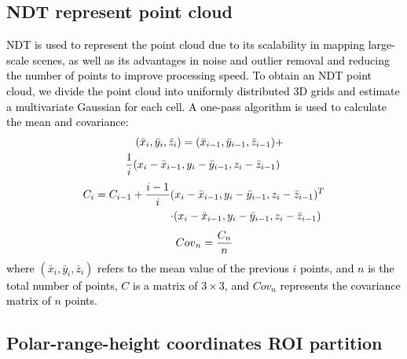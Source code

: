 \documentclass[letterpaper, 10 pt, conference]{ieeeconf}   %
\newcommand\kevin[1]{\textcolor{black}{#1}}
\begin{document}
\subsection{NDT represent point cloud}
\kevin{NDT is used to represent the point cloud due to its scalability in mapping large-scale scenes, as well as its advantages in noise and outlier removal and reducing the number of points to improve processing speed. To obtain an NDT point cloud, we divide the point cloud into uniformly distributed 3D grids and estimate a multivariate Gaussian for each cell. A one-pass algorithm is used to calculate the mean and covariance:}
\begin{equation}
\small
\begin{split}
\label{mean}
 (\bar{x}_i,\bar{y}_i,\bar{z}_i) = (\bar{x}_{i-1},\bar{y}_{i-1},\bar{z}_{i-1})+ \\  \frac{1}{i}(x_i-\bar{x}_{i-1},y_i-\bar{y}_{i-1},z_i-\bar{z}_{i-1}) \ \\ 
\end{split}
\end{equation}
\begin{equation}
\small
\begin{split}
\label{C_i}
C_i = C_{i-1} + \frac{i-1}{i}(x_i-\bar{x}_{i-1},y_i-\bar{y}_{i-1},z_i-\bar{z}_{i-1})^T \\ 
\cdot (x_i-\bar{x}_{i-1},y_i-\bar{y}_{i-1},z_i-\bar{z}_{i-1}) \ \\
\end{split}    
\end{equation}
\begin{equation}
\small
\begin{split}
\label{Cov_n}
{Cov}_n = \frac{C_n}{n}
\end{split}
\end{equation}
\kevin{where $\left({\bar{x}}_i,{\bar{y}}_i,{\bar{z}}_i\right)$ refers to the mean value of the previous $i$ points, and $n$ is the total number of points, $C$ is a matrix of $3\times3$, and ${Cov}_n$ represents the covariance matrix of $n$ points.}

\subsection{Polar-range-height coordinates ROI partition}
\end{document}
